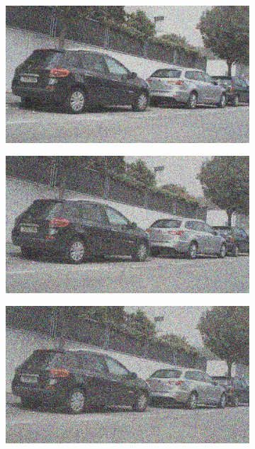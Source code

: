 \documentclass[a4paper]{ctexart}
\begin{document}
\begin{figure}[htbp]
\begin{subfigure}{0.08\textwidth}
			\label{fig：Gamma=0.8, Gauss Noise = 0.4}
		\end{subfigure}
		\begin{subfigure}{0.08\textwidth}
			\captionsetup{font=scriptsize}
			\includegraphics[width=\linewidth]{picture/Edge Detection/degrade/RGB_001 Gamma=0.8, Gauss Noise=0.5}
			\label{fig：Gamma=0.8, Gauss Noise = 0.5}
		\end{subfigure}
		\begin{subfigure}{0.08\textwidth}
			\captionsetup{font=scriptsize}
			\includegraphics[width=\linewidth]{picture/Edge Detection/degrade/RGB_001 Gamma=0.8, Gauss Noise=0.6}
			\label{fig：Gamma=0.8, Gauss Noise = 0.6}
		\end{subfigure}
		\begin{subfigure}{0.08\textwidth}
			\captionsetup{font=scriptsize}
			\includegraphics[width=\linewidth]{picture/Edge Detection/degrade/RGB_001 Gamma=0.8, Gauss Noise=0.7}

\end{subfigure}
\end{figure}
\end{document}
